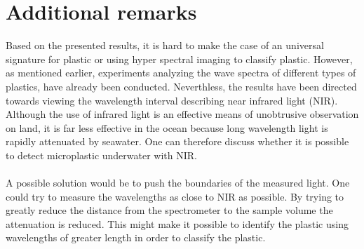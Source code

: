 \section{Additional remarks}
Based on the presented results, it is hard to make the case of an universal signature for plastic or using hyper spectral imaging to classify plastic. However, as mentioned earlier, experiments analyzing the wave spectra of different types of plastics, have already been conducted. Neverthless, the results have been directed towards viewing the wavelength interval describing near infrared light (NIR). Although the use of infrared light is an effective means of unobtrusive observation on land, it is far less effective in the ocean because long wavelength light is rapidly attenuated by seawater. One can therefore discuss whether it is possible to detect microplastic underwater with NIR.
\\\\
A possible solution would be to push the boundaries of the measured light. One could try to measure the wavelengths as close to NIR as possible. By trying to greatly reduce the distance from the spectrometer to the sample volume the attenuation is reduced. This might make it possible to identify the plastic using wavelengths of greater length in order to classify the plastic.
\\\\
\\\\



